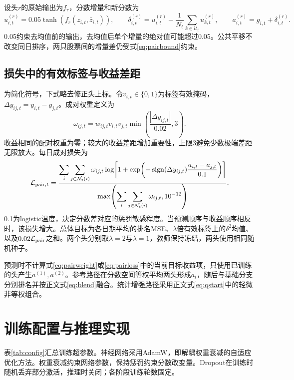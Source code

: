 \documentclass[UTF8,11pt,a4paper,fontset=fandol]{ctexart}
\begin{document}
设头$r$的原始输出为$f_r$，分数增量和新分数为
\begin{equation}
 u^{(r)}_{i,t}=0.05\tanh(f_r(z_{i,t},\bar z_{i,t})),\qquad
 \delta^{(r)}_{i,t}=u^{(r)}_{i,t}-\frac1{N_t}\sum_{k\in\mathcal U_t}u^{(r)}_{k,t},\qquad
 a^{(r)}_{i,t}=g_{i,t}+\delta^{(r)}_{i,t}.
 \label{eq:delta}
\end{equation}
0.05约束去均值前的输出，去均值后单个增量的绝对值可能超过0.05。公共平移不改变同日排序，两只股票间的增量差仍受式\eqref{eq:pairbound}约束。

\subsection{损失中的有效标签与收益差距}
为简化符号，下式略去修正头上标。令$v_{i,t}\in\{0,1\}$为标签有效掩码，$\Delta y_{ij,t}=y_{i,t}-y_{j,t}$。成对权重定义为
\begin{equation}
 \omega_{ij,t}=w_{ij,t}v_{i,t}v_{j,t}
 \min\!\left(\frac{|\Delta y_{ij,t}|}{0.02},3\right).
 \label{eq:pairweight}
\end{equation}
收益相同的配对权重为零；较大的收益差距增加重要性，上限3避免少数极端差距无限放大。每日成对损失为
\begin{equation}
 \mathcal L_{{\rm pair},t}=
 \frac{\displaystyle\sum_i\sum_{j\in\mathcal N_t(i)}\omega_{ij,t}
 \log\!\left[1+\exp\!\left(-\operatorname{sign}(\Delta y_{ij,t})
 \frac{a_{i,t}-a_{j,t}}{0.1}\right)\right]}
 {\displaystyle\max\!\left(\sum_i\sum_{j\in\mathcal N_t(i)}\omega_{ij,t},10^{-12}\right)}.
 \label{eq:pairloss}
\end{equation}
0.1为logistic温度，决定分数差对应的惩罚敏感程度。当预测顺序与收益顺序相反时，该损失增大。总体目标为各日期平均的排名MSE、$\lambda$倍有效标签上的$\delta^2$均值、以及$0.02\mathcal L_{\rm pair}$之和。两个头分别取$\lambda=2$与$\lambda=1$，教师保持冻结，两头使用相同随机种子。

预测时不计算式\eqref{eq:pairweight}或\eqref{eq:pairloss}中的当前目标收益项，只使用已训练的头产生$a^{(1)},a^{(2)}$。参考路径在分数空间等权平均两头形成$a_t$，随后与基础分支分别排名并按正文式\eqref{eq:blend}融合。统计增强路径采用正文式\eqref{eq:qstart}中的轻微非等权组合。

\section{训练配置与推理实现}\label{app:config}
表\ref{tab:config}汇总训练超参数。神经网络采用AdamW，即解耦权重衰减的自适应优化方法\cite{loshchilov2019}。权重衰减约束网络参数，保持惩罚约束分数改变量。Dropout在训练时随机丢弃部分激活，推理时关闭；各阶段训练轮数固定。
\end{document}
